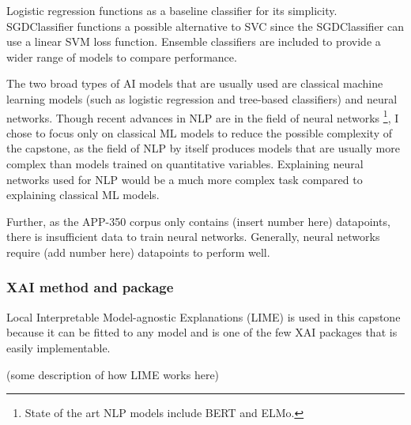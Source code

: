 Logistic regression functions as a baseline classifier for its simplicity. SGDClassifier functions a possible alternative to SVC since the SGDClassifier can use a linear SVM loss function. Ensemble classifiers are included to provide a wider range of models to compare performance.

The two broad types of AI models that are usually used are classical machine learning models (such as logistic regression and tree-based classifiers) and neural networks. Though recent advances in NLP are in the field of neural networks \footnote{State of the art NLP models include BERT and ELMo.}, I chose to focus only on classical ML models to reduce the possible complexity of the capstone, as the field of NLP by itself produces models that are usually more complex than models trained on quantitative variables. Explaining neural networks used for NLP would be a much more complex task compared to explaining classical ML models.

Further, as the APP-350 corpus only contains (insert number here) datapoints, there is insufficient data to train neural networks. Generally, neural networks require (add number here) datapoints to perform well.

\subsubsection{XAI method and package}

Local Interpretable Model-agnostic Explanations (LIME) is used in this capstone because it can be fitted to any model and is one of the few XAI packages that is easily implementable. 

(some description of how LIME works here)